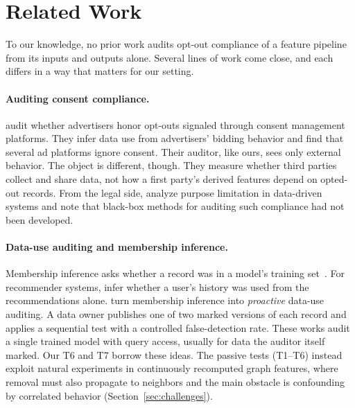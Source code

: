 \documentclass[10pt,twocolumn,letterpaper]{article}
\theoremstyle{definition}
\begin{document}
\section{Related Work}\label{sec:related}
To our knowledge, no prior work audits opt-out compliance of a feature
pipeline from its inputs and outputs alone. Several lines of work come close,
and each differs in a way that matters for our setting.

\paragraph{Auditing consent compliance.}
\citet{liu2024optedout} audit whether advertisers honor opt-outs signaled
through consent management platforms. They infer data use from advertisers'
bidding behavior and find that several ad platforms ignore consent. Their
auditor, like ours, sees only external behavior. The object is different,
though. They measure whether third parties collect and share data, not how a
first party's derived features depend on opted-out records. From the legal
side, \citet{biega2021reviving} analyze purpose limitation in data-driven
systems and note that black-box methods for auditing such compliance had not
been developed.

\paragraph{Data-use auditing and membership inference.}
Membership inference asks whether a record was in a model's training
set~\citep{shokri2017membership,carlini2022first}. For recommender systems,
\citet{zhang2021membership} infer whether a user's history was used from the
recommendations alone. \citet{huang2024general} turn membership inference into
\emph{proactive} data-use auditing. A data owner publishes one of two marked
versions of each record and applies a sequential test with a controlled
false-detection rate. These works audit a single trained model with query
access, usually for data the auditor itself marked. Our T6 and T7 borrow these
ideas. The passive tests (T1--T6) instead exploit natural experiments in
continuously recomputed graph features, where removal must also propagate to
neighbors and the main obstacle is confounding by correlated behavior
(Section~\ref{sec:challenges}).
\end{document}
